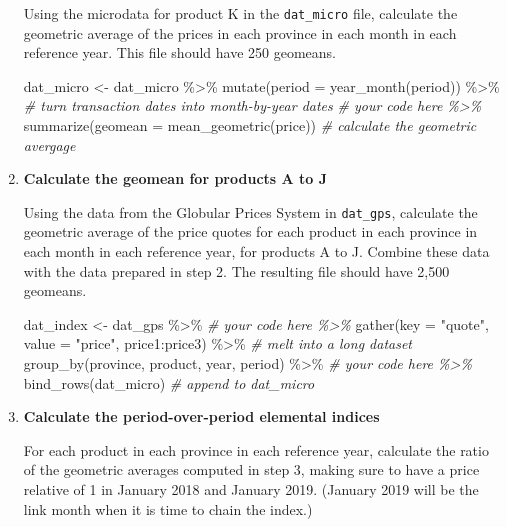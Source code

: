 \documentclass[
]{article}
\newenvironment{Shaded}{\begin{snugshade}}{\end{snugshade}}
\newcommand{\AttributeTok}[1]{\textcolor[rgb]{0.77,0.63,0.00}{#1}}
\newcommand{\CommentTok}[1]{\textcolor[rgb]{0.56,0.35,0.01}{\textit{#1}}}
\newcommand{\FunctionTok}[1]{\textcolor[rgb]{0.00,0.00,0.00}{#1}}
\newcommand{\NormalTok}[1]{#1}
\newcommand{\OtherTok}[1]{\textcolor[rgb]{0.56,0.35,0.01}{#1}}
\newcommand{\SpecialCharTok}[1]{\textcolor[rgb]{0.00,0.00,0.00}{#1}}
\newcommand{\StringTok}[1]{\textcolor[rgb]{0.31,0.60,0.02}{#1}}
\begin{document}
\begin{enumerate}
  Using the microdata for product K in the \texttt{dat\_micro} file, calculate the geometric average of the prices in each province in each month in each reference year. This file should have 250 geomeans.

\begin{Shaded}
\begin{Highlighting}[]
\NormalTok{dat\_micro }\OtherTok{\textless{}{-}}\NormalTok{ dat\_micro }\SpecialCharTok{\%\textgreater{}\%}
  \FunctionTok{mutate}\NormalTok{(}\AttributeTok{period =} \FunctionTok{year\_month}\NormalTok{(period)) }\SpecialCharTok{\%\textgreater{}\%} \CommentTok{\# turn transaction dates into month{-}by{-}year dates}
  \CommentTok{\# your code here \%\textgreater{}\%}
  \FunctionTok{summarize}\NormalTok{(}\AttributeTok{geomean =} \FunctionTok{mean\_geometric}\NormalTok{(price)) }\CommentTok{\# calculate the geometric avergage}
\end{Highlighting}
\end{Shaded}
\item
  \textbf{Calculate the geomean for products A to J}

  Using the data from the Globular Prices System in \texttt{dat\_gps}, calculate the geometric average of the price quotes for each product in each province in each month in each reference year, for products A to J. Combine these data with the data prepared in step 2. The resulting file should have 2,500 geomeans.

\begin{Shaded}
\begin{Highlighting}[]
\NormalTok{dat\_index }\OtherTok{\textless{}{-}}\NormalTok{ dat\_gps }\SpecialCharTok{\%\textgreater{}\%}
  \CommentTok{\# your code here \%\textgreater{}\%}
  \FunctionTok{gather}\NormalTok{(}\AttributeTok{key =} \StringTok{"quote"}\NormalTok{, }\AttributeTok{value =} \StringTok{"price"}\NormalTok{, price1}\SpecialCharTok{:}\NormalTok{price3) }\SpecialCharTok{\%\textgreater{}\%} \CommentTok{\# melt into a long dataset}
  \FunctionTok{group\_by}\NormalTok{(province, product, year, period) }\SpecialCharTok{\%\textgreater{}\%}
  \CommentTok{\# your code here \%\textgreater{}\%}
  \FunctionTok{bind\_rows}\NormalTok{(dat\_micro) }\CommentTok{\# append to dat\_micro}
\end{Highlighting}
\end{Shaded}
\item
  \textbf{Calculate the period-over-period elemental indices}

  For each product in each province in each reference year, calculate the ratio of the geometric averages computed in step 3, making sure to have a price relative of 1 in January 2018 and January 2019. (January 2019 will be the link month when it is time to chain the index.)


\end{enumerate}
\end{document}
